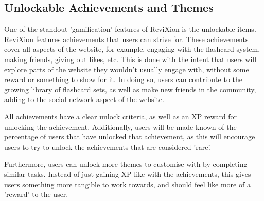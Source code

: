 \documentclass{report}
\begin{document}
\subsection{Unlockable Achievements and Themes}

One of the standout 'gamification' features of ReviXion is the unlockable items.
ReviXion features achievements that users can strive for.
These achievements cover all aspects of the website, for example, engaging with the flashcard system, making friends, giving out likes, etc.
This is done with the intent that users will explore parts of the website they wouldn't usually engage with, without some reward or something to show for it.
In doing so, users can contribute to the growing library of flashcard sets, as well as make new friends in the community, adding to the social network aspect of the website.

All achievements have a clear unlock criteria, as well as an XP reward for unlocking the achievement.
Additionally, users will be made known of the percentage of users that have unlocked that achievement,
as this will encourage users to try to unlock the achievements that are considered 'rare'.

Furthermore, users can unlock more themes to customise with by completing similar tasks.
Instead of just gaining XP like with the achievements, this gives users something more tangible to work towards,
and should feel like more of a 'reward' to the user.
\end{document}
